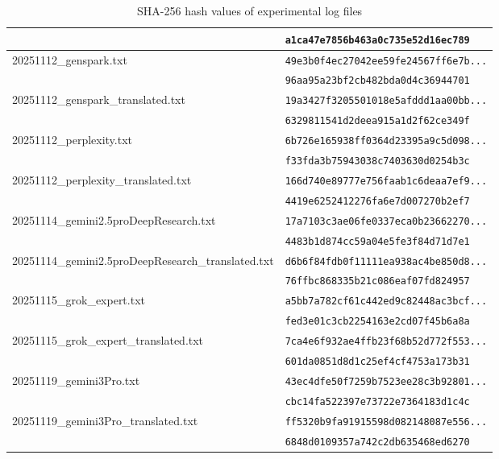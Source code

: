 \documentclass[11pt, a4paper]{article}
\begin{document}
\begin{table}[h]
\begin{tabular}{|l|l|}
 & \texttt{a1ca47e7856b463a0c735e52d16ec789} \\
\hline
20251112\_genspark.txt & \texttt{49e3b0f4ec27042ee59fe24567ff6e7b...} \\
 & \texttt{96aa95a23bf2cb482bda0d4c36944701} \\
\hline
20251112\_genspark\_translated.txt & \texttt{19a3427f3205501018e5afddd1aa00bb...} \\
 & \texttt{6329811541d2deea915a1d2f62ce349f} \\
\hline
20251112\_perplexity.txt & \texttt{6b726e165938ff0364d23395a9c5d098...} \\
 & \texttt{f33fda3b75943038c7403630d0254b3c} \\
\hline
20251112\_perplexity\_translated.txt & \texttt{166d740e89777e756faab1c6deaa7ef9...} \\
 & \texttt{4419e6252412276fa6e7d007270b2ef7} \\
\hline
20251114\_gemini2.5proDeepResearch.txt & \texttt{17a7103c3ae06fe0337eca0b23662270...} \\
 & \texttt{4483b1d874cc59a04e5fe3f84d71d7e1} \\
\hline
20251114\_gemini2.5proDeepResearch\_translated.txt & \texttt{d6b6f84fdb0f11111ea938ac4be850d8...} \\
 & \texttt{76ffbc868335b21c086eaf07fd824957} \\
\hline
20251115\_grok\_expert.txt & \texttt{a5bb7a782cf61c442ed9c82448ac3bcf...} \\
 & \texttt{fed3e01c3cb2254163e2cd07f45b6a8a} \\
\hline
20251115\_grok\_expert\_translated.txt & \texttt{7ca4e6f932ae4ffb23f68b52d772f553...} \\
 & \texttt{601da0851d8d1c25ef4cf4753a173b31} \\
\hline
20251119\_gemini3Pro.txt & \texttt{43ec4dfe50f7259b7523ee28c3b92801...} \\
 & \texttt{cbc14fa522397e73722e7364183d1c4c} \\
\hline
20251119\_gemini3Pro\_translated.txt & \texttt{ff5320b9fa91915598d082148087e556...} \\
 & \texttt{6848d0109357a742c2db635468ed6270} \\
\hline
\end{tabular}
\caption{SHA-256 hash values of experimental log files}
\end{table}
\end{document}
